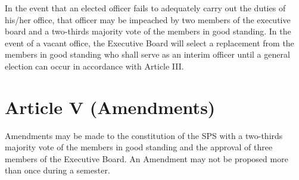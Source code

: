 \documentclass[12pt,a4paper]{article}
\begin{document}
In the event that an elected officer fails to adequately carry out the duties of his/her office, that officer may be impeached by two members of the executive board and a two-thirds majority vote of the members in good standing. In the event of a vacant office, the Executive Board will select a replacement from the members in good standing who shall serve as an interim officer until a general election can occur in accordance with Article III. 

\section{Article V (Amendments)}
Amendments may be made to the constitution of the SPS with a two-thirds majority vote of the members in good standing and the approval of three members of the Executive Board. An Amendment may not be proposed more than once during a semester. 

\end{document}
